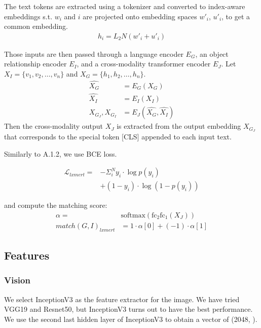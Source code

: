 \documentclass[11pt]{article}
\begin{document}
The text tokens are extracted using a tokenizer \cite{wu2016google} and converted to index-aware embeddings s.t. $w_i$ and $i$ are projected onto embedding spaces $w'_i$, $u'_i$, to get a common embedding. 
\begin{align}
    h_i = L_2N(w'_i+u'_i)
\end{align} 

Those inputs are then passed through a language encoder $E_G$, an object relationship encoder $E_I$, and a cross-modality transformer encoder $E_J$. Let $X_I = \{v_1, v_2, \ldots, v_n\}$ and $X_G = \{h_1, h_2, \ldots, h_n\}$.    
\begin{equation}
\begin{split}
    \hat{X_G} &= E_G(X_G) \\
    \hat{X_I} &= E_I(X_I) \\
    X_{G_J}, X_{G_I} &= E_J(\hat{X_G}, \hat{X_I})
\end{split}
\end{equation}
Then the cross-modality output $X_J$ is extracted from the output embedding $X_{G_J}$ that corresponds to the special token [CLS] appended to each input text. 

Similarly to A.1.2, we use BCE loss.

\begin{equation}
\begin{split}
    \mathcal{L}_{lxmert} =&  - \Sigma_i^N y_i \cdot \log p (y_i) \\ 
    &+ (1 - y_i) \cdot \log (1 - p(y_i))
\end{split}
\end{equation}

and compute the matching score:
\begin{equation}
\begin{split}
    \alpha = &\mathrm{softmax}(\mathrm{fc}_2\mathrm{fc}_1(X_J)) \\
    match (G, I)_{lxmert} &= 1 \cdot \alpha[0] + (-1) \cdot \alpha[1]
\end{split}
\end{equation}
\subsection{Features}
\subsubsection{Vision}
We select InceptionV3 \cite{DBLP:journals/corr/SzegedyVISW15} as the feature extractor for the image. We have tried VGG19 and Resnet50, but InceptionV3 turns out to have the best performance. We use the second last hidden layer of InceptionV3 to obtain a vector of (2048, ). 
\end{document}
